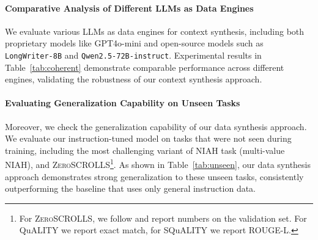 \noindent\paragraph{Comparative Analysis of Different LLMs as Data Engines}
We evaluate various LLMs as data engines for context synthesis, including both proprietary models like GPT4o-mini and open-source models such as \texttt{LongWriter-8B} and \texttt{Qwen2.5-72B-instruct}.
Experimental results in Table~\ref{tab:coherent} demonstrate comparable performance across different engines, validating the robustness of our context synthesis approach.

\noindent\paragraph{Evaluating Generalization Capability on Unseen Tasks}
Moreover, we check the generalization capability of our data synthesis approach.
We evaluate our instruction-tuned model on tasks that were not seen during training, including the most challenging variant of NIAH task (multi-value NIAH), and \textsc{ZeroSCROLLS}\footnote{For \textsc{ZeroSCROLLS}, we follow \citet{dubey2024llama} and report numbers on the validation set. For QuALITY we report exact match, for SQuALITY we report ROUGE-L.}.
As shown in Table~\ref{tab:unseen}, our data synthesis approach demonstrates strong generalization to these unseen tasks, consistently outperforming the baseline that uses only general instruction data.

\begingroup
\renewcommand{\arraystretch}{1.3}
\begin{table}[]
\footnotesize
\centering
{}
\caption{Results on unseen tasks from \textsc{RULER} and \textsc{ZeroSCROLLS}. NIAH results show the average across different tested lengths. Numbers in parentheses indicate performance improvements. All experiments are conducted with \texttt{LLaMA3.1-8B}.}
\label{tab:unseen}
\end{table}
\endgroup